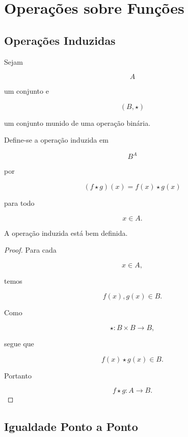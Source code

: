\documentclass[../../main]{subfiles}
\begin{document}
\section{Operações sobre Funções}
\label{sec:matematica:funcoes:operacoes}

\subsection{Operações Induzidas}

\begin{defn}
	\label{def:matematica:funcoes:operacoes:induzida}

	Sejam

	\[
		A
	\]

	um conjunto e

	\[
		(B,\star)
	\]

	um conjunto munido de uma operação binária.

	Define-se a operação induzida em

	\[
		B^A
	\]

	por

	\[
		(f\star g)(x)
		=
		f(x)\star g(x)
	\]

	para todo

	\[
		x\in A.
	\]

\end{defn}

\begin{prop}
	\label{prop:matematica:funcoes:operacoes:boa-definicao}

	A operação induzida está bem definida.

\end{prop}

\begin{proof}

	Para cada

	\[
		x\in A,
	\]

	temos

	\[
		f(x),g(x)\in B.
	\]

	Como

	\[
		\star:B\times B\to B,
	\]

	segue que

	\[
		f(x)\star g(x)\in B.
	\]

	Portanto

	\[
		f\star g:A\to B.
	\]

\end{proof}

\subsection{Igualdade Ponto a Ponto}
\end{document}
